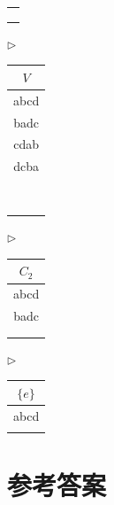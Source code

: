 \documentclass[b5paper]{ctexart}
\begin{document}
\begin{center}
\begin{tabular}[t]{|c|}
\\
\\
\\
\\
\hline
\end{tabular}
\parbox[t]{3mm}{\vspace{2mm} $\rhd$}
\begin{tabular}[t]{|c|}
\hline
$V$ \\
\hline
abcd \\
badc \\
cdab \\
dcba \\
\hline
\\
\\
\\
\\
\hline
\\
\\
\\
\\
\hline
\end{tabular}
\parbox[t]{3mm}{\vspace{2mm} $\rhd$}
\begin{tabular}[t]{|c|}
\hline
$C_2$ \\
\hline
abcd \\
badc \\
\hline
\\
\\
\hline
\end{tabular}
\parbox[t]{3mm}{\vspace{2mm} $\rhd$}
\begin{tabular}[t]{|c|}
\hline
$\{e\}$ \\
\hline
abcd \\
\hline
\\
\hline
\end{tabular}
\end{center}

\ifx\wholebook\relax \else
\section{参考答案}
\shipoutAnswer
\end{document}
